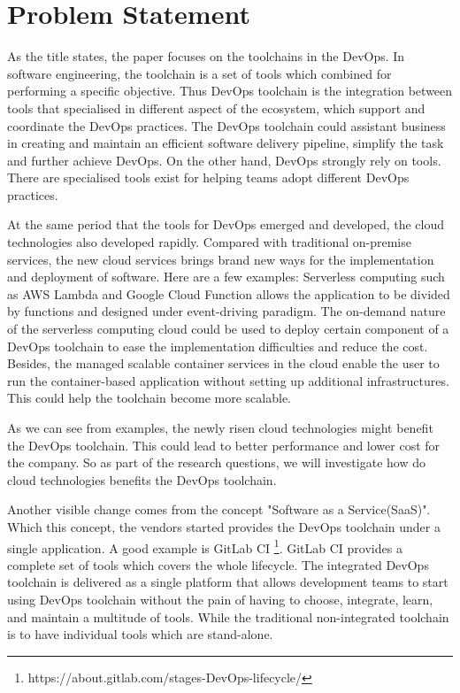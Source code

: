 \section{Problem Statement}
As the title states, the paper focuses on the toolchains in the DevOps. In software engineering, the toolchain is a set of tools which combined for performing a specific objective. Thus DevOps toolchain is the integration between tools that specialised in different aspect of the ecosystem, which support and coordinate the DevOps practices. The DevOps toolchain could assistant business in creating and maintain an efficient software delivery pipeline, simplify the task and further achieve DevOps.\cite{DevOpsto7:online}\cite{Toolchai10:online} On the other hand, DevOps strongly rely on tools. There are specialised tools exist for helping teams adopt different DevOps practices\cite{zhu2016devops}.
\par
At the same period that the tools for DevOps emerged and developed, the cloud technologies also developed rapidly. Compared with traditional on-premise services, the new cloud services brings brand new ways for the implementation and deployment of software. Here are a few examples: Serverless computing such as AWS Lambda and Google Cloud Function allows the application to be divided by functions and designed under event-driving paradigm. The on-demand nature of the serverless computing cloud could be used to deploy certain component of a DevOps toolchain to ease the implementation difficulties and reduce the cost. Besides, the managed scalable container services in the cloud enable the user to run the container-based application without setting up additional infrastructures. This could help the toolchain become more scalable. 
\par
As we can see from examples, the newly risen cloud technologies might benefit the DevOps toolchain. This could lead to better performance and lower cost for the company. So as part of the research questions, we will investigate how do cloud technologies benefits the DevOps toolchain.
\par
Another visible change comes from the concept "Software as a Service(SaaS)". Which this concept, the vendors started provides the DevOps toolchain under a single application. A good example is GitLab CI \footnote{https://about.gitlab.com/stages-DevOps-lifecycle/}. GitLab CI provides a complete set of tools which covers the whole lifecycle.
The integrated DevOps toolchain is delivered as a single platform that allows development teams to start using DevOps toolchain without the pain of having to choose, integrate, learn, and maintain a multitude of tools. While the traditional non-integrated toolchain is to have individual tools which are stand-alone.
